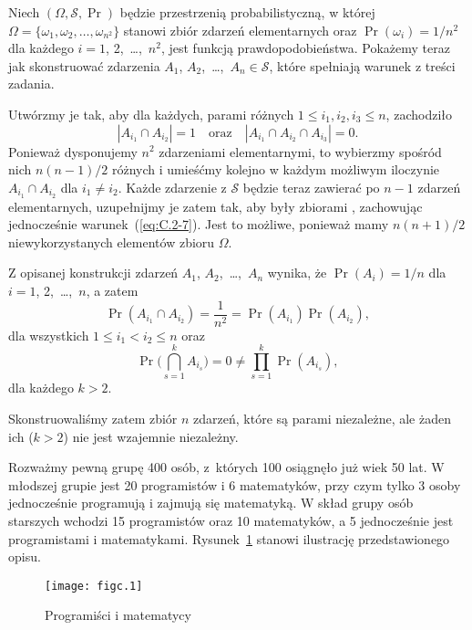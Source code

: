 \exercise{} %
\noindent Niech $(\Omega,\mathcal{S},\Pr)$ będzie przestrzenią probabilistyczną, w której $\Omega=\{\omega_1,\omega_2,\dots,\omega_{n^2}\}$ stanowi zbiór zdarzeń elementarnych oraz $\Pr(\omega_i)=1/n^2$ dla każdego $i=1$, 2,~\dots,~$n^2$, jest funkcją prawdopodobieństwa. Pokażemy teraz jak skonstruować zdarzenia $A_1$, $A_2$,~\dots,~$A_n\in\mathcal{S}$, które spełniają warunek z treści zadania.

Utwórzmy je tak, aby dla każdych, parami różnych $1\le i_1,i_2,i_3\le n$, zachodziło
\begin{equation}
	|A_{i_1}\cap A_{i_2}| = 1 \quad\text{oraz}\quad |A_{i_1}\cap A_{i_2}\cap A_{i_3}| = 0. \label{eq:C.2-7}
\end{equation}
Ponieważ dysponujemy $n^2$ zdarzeniami elementarnymi, to wybierzmy spośród nich $n(n-1)/2$ różnych i umieśćmy kolejno w każdym możliwym iloczynie $A_{i_1}\cap A_{i_2}$ dla $i_1\ne i_2$. Każde zdarzenie z $\mathcal{S}$ będzie teraz zawierać po $n-1$ zdarzeń elementarnych, uzupełnijmy je zatem tak, aby były zbiorami , zachowując jednocześnie warunek~(\ref{eq:C.2-7}). Jest to możliwe, ponieważ mamy $n(n+1)/2$ niewykorzystanych elementów zbioru $\Omega$.

Z opisanej konstrukcji zdarzeń $A_1$, $A_2$,~\dots,~$A_n$ wynika, że $\Pr(A_i)=1/n$ dla $i=1$, 2,~\dots,~$n$, a zatem
\[
	\Pr(A_{i_1}\cap A_{i_2}) = \frac{1}{n^2} = \Pr(A_{i_1})\Pr(A_{i_2}),
\]
dla wszystkich $1\le i_1<i_2\le n$ oraz
\[
	\Pr\biggl(\bigcap_{s=1}^kA_{i_s}\biggr) = 0 \ne \prod_{s=1}^k\Pr(A_{i_s}),
\]
dla każdego $k>2$.

Skonstruowaliśmy zatem zbiór $n$ zdarzeń, które są parami niezależne, ale żaden ich  ($k>2$) nie jest wzajemnie niezależny.

\exercise{} %
\noindent Rozważmy pewną grupę 400 osób, z~których 100 osiągnęło już wiek 50 lat. W młodszej grupie jest 20 programistów i 6 matematyków, przy czym tylko 3 osoby jednocześnie programują i zajmują się matematyką. W skład grupy osób starszych wchodzi 15 programistów oraz 10 matematyków, a 5 jednocześnie jest programistami i matematykami. Rysunek~\ref{fig:C.2-8} stanowi ilustrację przedstawionego opisu.
\begin{figure}[ht]
	\begin{center}
		\texttt{[image: figc.1]}
	\end{center}
	\caption{Programiści i matematycy} \label{fig:C.2-8}
\end{figure}

